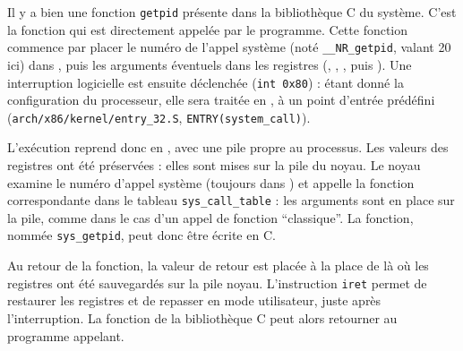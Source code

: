Il y a bien une fonction \texttt{getpid} présente dans la bibliothèque C du
système. C'est la fonction qui est directement appelée par le programme. Cette
fonction commence par placer le numéro de l'appel système (noté
\texttt{\_\_NR\_getpid}, valant 20 ici) dans \eax, puis les arguments éventuels
dans les registres (\ebx, \ecx, \edx, \esi puis \edi). Une interruption
logicielle est ensuite déclenchée (\texttt{int 0x80}) : étant donné la
configuration du processeur, elle sera traitée en , à un point
d'entrée prédéfini (\texttt{arch/x86/kernel/entry\_32.S},
\texttt{ENTRY(system\_call)}).

L'exécution reprend donc en , avec une pile propre au processus.
Les valeurs des registres ont été préservées : elles sont mises sur la pile du
noyau. Le noyau examine le numéro d'appel système (toujours dans \eax) et
appelle la fonction correspondante dans le tableau \texttt{sys\_call\_table} :
les arguments sont en place sur la pile, comme dans le cas d'un appel de
fonction ``classique''. La fonction, nommée \texttt{sys\_getpid}, peut donc être
écrite en C.

Au retour de la fonction, la valeur de retour est placée à la place de \eax là
où les registres ont été sauvegardés sur la pile noyau. L'instruction
\texttt{iret} permet de restaurer les registres et de repasser en mode
utilisateur, juste après l'interruption. La fonction de la bibliothèque C peut
alors retourner au programme appelant.

